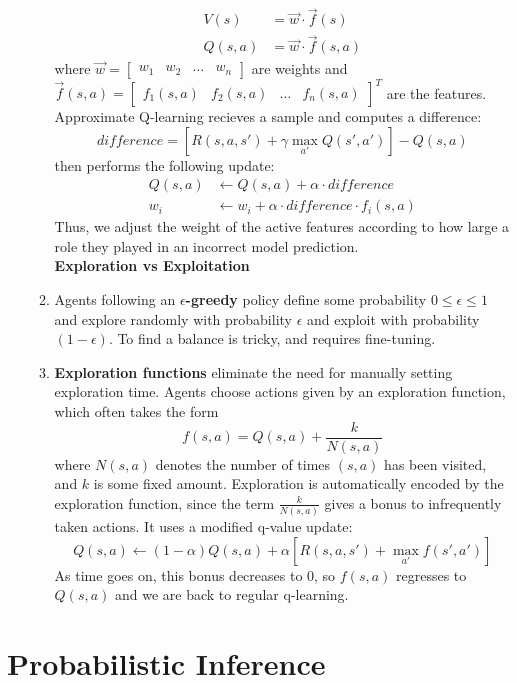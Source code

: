\documentclass[10pt]{article}
\begin{document}
\begin{multicols}{2}
\begin{enumerate}
\begin{enumerate}
        \begin{align*}
            V(s)&=\vec{w} \cdot \vec{f}(s) \\
            Q(s,a)&= \vec{w} \cdot \vec{f}(s,a)
        \end{align*}
        where $\vec{w}=\begin{bmatrix} w_1 & w_2 & \hdots & w_n \end{bmatrix}$ are weights and $\vec{f}(s,a)=\begin{bmatrix} f_1(s,a) & f_2(s,a) & \hdots & f_n(s,a) \end{bmatrix}^T$ are the features. Approximate Q-learning recieves a sample and computes a difference: $$\textit{difference}= [R(s,a,s')+\gamma\max_{a'} Q(s',a')] - Q(s,a)$$ then performs the following update: 
        \begin{align*}
            Q(s,a) &\leftarrow Q(s,a) + \alpha \cdot \textit{difference} \\
            w_i &\leftarrow w_i + \alpha \cdot \textit{difference} \cdot f_i(s,a)
        \end{align*}
        Thus, we adjust the weight of the active features according to how large a role they played in an incorrect model prediction. \\[8 pt]
        \textbf{Exploration vs Exploitation}
        \item Agents following an \textbf{$\epsilon$-greedy} policy define some probability $0 \leq \epsilon \leq 1$ and explore randomly with probability $\epsilon$ and exploit with probability $(1-\epsilon)$. To find a balance is tricky, and requires fine-tuning.
        \item \textbf{Exploration functions} eliminate the need for manually setting exploration time. Agents choose actions given by an exploration function, which often takes the form $$f(s,a)=Q(s,a)+\frac{k}{N(s,a)}$$ where $N(s,a)$ denotes the number of times $(s,a)$ has been visited, and $k$ is some fixed amount. Exploration is automatically encoded by the exploration function, since the term $\frac{k}{N(s,a)}$ gives a bonus to infrequently taken actions. It uses a modified q-value update:
        $$Q(s,a) \leftarrow (1-\alpha)Q(s,a)+\alpha[R(s,a,s')+\max_{a'}f(s',a')]$$
        As time goes on, this bonus decreases to 0, so $f(s,a)$ regresses to $Q(s,a)$ and we are back to regular q-learning.
        \end{enumerate}
    \end{enumerate}
    \section{Probabilistic Inference}
    \begin{enumerate}

\end{enumerate}
\end{multicols}
\end{document}
